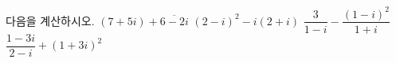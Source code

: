 다음을 계산하시오.
 $(7+5i)+\overline{6-2i}$
 $(2-i)^2-i(2+i)$
 $\dfrac{3}{1-i}-\dfrac{(1-i)^2}{1+i}$
 $\dfrac{1-3i}{2-i}+(1+3i)^2$
